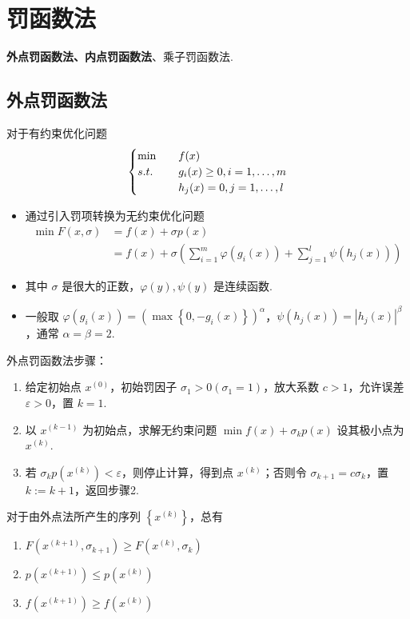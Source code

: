 \section{罚函数法}
\textbf{外点罚函数法、内点罚函数法}、乘子罚函数法.

\subsection{外点罚函数法}
\begin{note}
    对于有约束优化问题 \[\begin{cases}
        \min \quad &f(x)\\
        s.t. \quad &g_i(x) \ge 0, i = 1, \dots, m\\
        &h_j(x) = 0, j = 1, \dots, l
    \end{cases}\]
    \begin{itemize}
        \item 通过引入罚项转换为无约束优化问题 \begin{align*}
            \min F(x, \sigma) &= f(x) + \sigma p(x)\\
            &= f(x) + \sigma \left(\sum_{i = 1}^m \varphi(g_i(x)) + \sum_{j = 1}^l \psi(h_j(x))\right)
        \end{align*}
        \item 其中 $\sigma$ 是很大的正数，$\varphi(y), \psi(y)$ 是连续函数.
        \item 一般取 $\varphi(g_i(x)) = \left(\max\left\{0, -g_i(x)\right\}\right)^\alpha$，$\psi(h_j(x)) = |h_j(x)|^\beta$，通常 $\alpha = \beta = 2$.
    \end{itemize}
\end{note}

\begin{note}
    外点罚函数法步骤：\begin{enumerate}
        \item 给定初始点 $x^{(0)}$，初始罚因子 $\sigma_1 > 0(\sigma_1 = 1)$，放大系数 $c > 1$，允许误差 $\varepsilon > 0$，置 $k = 1$.
        \item 以 $x^{(k - 1)}$ 为初始点，求解无约束问题 $\min f(x) + \sigma_k p(x)$ 设其极小点为 $x^{(k)}$.
        \item 若 $\sigma_kp(x^{(k)}) < \varepsilon$，则停止计算，得到点 $x^{(k)}$；否则令 $\sigma_{k + 1} = c\sigma_k$，置 $k := k + 1$，返回步骤2.
    \end{enumerate}
\end{note}

\begin{theorem}
    对于由外点法所产生的序列 $\left\{x^{(k)}\right\}$，总有\begin{enumerate}
        \item $F(x^{(k + 1)}, \sigma_{k + 1}) \ge F(x^{(k)}, \sigma_k)$
        \item $p(x^{(k + 1)}) \le p(x^{(k)})$
        \item $f(x^{(k + 1)}) \ge f(x^{(k)})$
    \end{enumerate}
\end{theorem}

